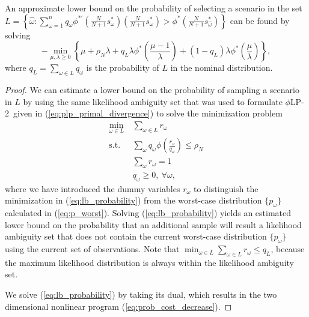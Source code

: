 \documentclass[ijoc,letterpaper]{informs3} %
\newcommand{\plp}{$\phi$LP-2}
\begin{document}
\begin{proposition}
	An approximate lower bound on the probability of selecting a scenario in the set $L = \left\{ \hat{\omega} : \sum_{\omega=1}^n q_\omega \phi^{*\prime}\left(\frac{N}{N+1}s^*_\omega\right) \left(\frac{N}{N+1}s^*_\omega\right) > \phi^*\left(\frac{N}{N+1}s^*_{\hat{\omega}}\right) \right\}$ can be found by solving 
	\begin{equation} \label{eq:prob_cost_decrease}
		-\min_{\mu,\lambda \geq 0} \left\{ \mu + \rho_N \lambda + q_L \lambda \phi^*\left(\frac{\mu-1}{\lambda}\right) + (1-q_L) \lambda \phi^*\left(\frac{\mu}{\lambda}\right) \right\},
	\end{equation}
	where $q_L = \sum_{\omega \in L} q_\omega$ is the probability of $L$ in the nominal distribution.
\end{proposition}

\begin{proof}
	We can estimate a lower bound on the probability of sampling a scenario in $L$ by using the same likelihood ambiguity set that was used to formulate \plp\ given in (\ref{eq:plp_primal_divergence}) to solve the minimization problem
	\begin{align}
		\min_{\omega \in L} \ & \sum_{\omega \in L} r_\omega \nonumber \\
		\mbox{s.t.} & \sum_\omega q_\omega \phi\left(\frac{r_\omega}{q_\omega}\right) \leq \rho_N \label{eq:lb_probability} \\
		& \sum_\omega r_\omega = 1 \nonumber \\
		& q_\omega \geq 0, \ \forall \omega, \nonumber
	\end{align}
	where we have introduced the dummy variables $r_\omega$ to distinguish the minimization in (\ref{eq:lb_probability}) from the worst-case distribution $\{p_\omega\}$ calculated in (\ref{eq:p_worst}). 
	Solving (\ref{eq:lb_probability}) yields an estimated lower bound on the probability that an additional sample will result a likelihood ambiguity set that does not contain the current worst-case distribution $\{p_\omega\}$ using the current set of observations.
	Note that $\min_{\omega \in L} \sum_{\omega \in L} r_\omega \leq q_L$, because the maximum likelihood distribution is always within the likelihood ambiguity set.

	We solve (\ref{eq:lb_probability}) by taking its dual, which results in the two dimensional nonlinear program (\ref{eq:prob_cost_decrease}).
\end{proof}
\end{document}
